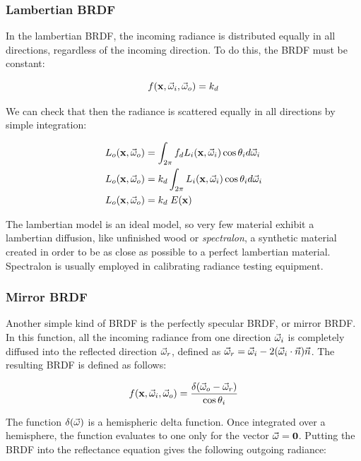 \subsubsection{Lambertian BRDF}

In the lambertian BRDF, the incoming radiance is distributed equally in all directions, regardless of the incoming direction. To do this, the BRDF must be constant:

$$
f(\mathbf{x}, \vec{\omega}_i, \vec{\omega}_o) = k_d
$$

We can check that then the radiance is scattered equally in all directions by simple integration:

\begin{equation*}
\begin{split}
L_o(\mathbf{x}, \vec{\omega}_o) &= \int_{2\pi} f_d L_i(\mathbf{x}, \vec{\omega}_i) \cos\theta_i d\vec{\omega}_i \\
L_o(\mathbf{x}, \vec{\omega}_o) &= k_d \int_{2\pi} L_i(\mathbf{x}, \vec{\omega}_i) \cos\theta_i d\vec{\omega}_i \\
L_o(\mathbf{x}, \vec{\omega}_o) &= k_d \; E(\mathbf{x}) \\
\end{split}
\end{equation*}

The lambertian model is an ideal model, so very few material exhibit a lambertian diffusion, like unfinished wood or \emph{spectralon}, a synthetic material created in order to be as close as possible to a perfect lambertian material. Spectralon is usually employed in calibrating radiance testing equipment. 

\subsubsection{Mirror BRDF}

Another simple kind of BRDF is the perfectly specular BRDF, or mirror BRDF. In this function, all the incoming radiance from one direction $\vec{\omega}_i$ is completely diffused into the reflected direction $\vec{\omega}_r$, defined as $\vec{\omega}_r = \vec{\omega}_i - 2 (\vec{\omega}_i \cdot \vec{n}) \vec{n}$. The resulting BRDF is defined as follows:

$$
f(\mathbf{x}, \vec{\omega}_i, \vec{\omega}_o) = \frac{\delta(\vec{\omega}_o - \vec{\omega}_r)}{\cos\theta_i} 
$$

The function $\delta(\vec{\omega})$ is a hemispheric delta function. Once integrated over a hemisphere, the function evaluates to one only for the vector $\vec{\omega} = \mathbf{0}$. Putting the BRDF into the reflectance equation gives the following outgoing radiance:

